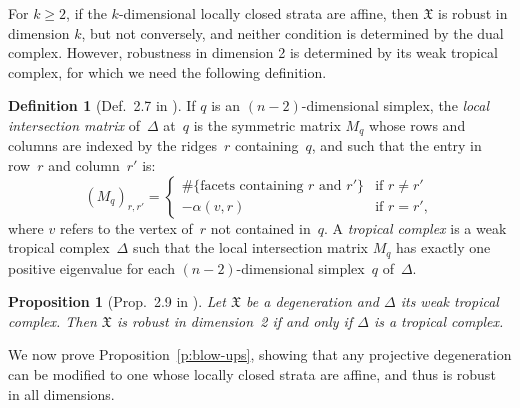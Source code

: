 \documentclass[11pt]{amsart}
\newtheorem{prop}[thm]{Proposition}
\theoremstyle{definition}
\newtheorem{defn}[thm]{Definition}
\newcommand{\defi}[1]{\emph{#1}}
\newcommand{\X}{\mathfrak X}
\begin{document}
For $k \geq 2$, if the $k$-dimensional locally closed strata are affine, then
$\X$ is robust in dimension $k$, but
not conversely, and neither condition is determined by the dual complex.
However, robustness in dimension 2 is determined by its weak tropical complex,
for which we need the following definition.

\begin{defn}[Def.~2.7 in \cite{cartwright-complexes}]
If $q$ is an $(n-2)$-dimensional simplex, the \defi{local intersection matrix}
of~$\Delta$ at~$q$ is the symmetric matrix $M_q$ whose rows and columns are
indexed by the ridges~$r$ containing~$q$, and such that the entry in row~$r$ and
column~$r'$ is:
\begin{equation*}
(M_{q})_{r,r'} = \begin{cases}
\#\{\mbox{facets containing $r$ and $r'$}\} & \mbox{if } r \neq r' \\
-\alpha(v, r) & \mbox{if } r = r',
\end{cases}
\end{equation*}
where $v$ refers to the vertex of~$r$ not contained in~$q$.
A \defi{tropical complex} is a weak tropical complex~$\Delta$ such that the
local intersection matrix $M_q$ has exactly one positive eigenvalue for each
$(n-2)$-dimensional simplex~$q$ of~$\Delta$.
\end{defn}

\begin{prop}[Prop.~2.9 in \cite{cartwright-complexes}]
\label{p:robust-dim-2}
Let $\X$ be a degeneration and $\Delta$ its weak tropical complex. Then $\X$ is
robust in dimension~2 if and only if $\Delta$ is a tropical complex.
\end{prop}

We now prove Proposition~\ref{p:blow-ups}, showing that any projective
degeneration can be modified to one whose locally closed strata are affine, and
thus is robust in all dimensions.
\end{document}
